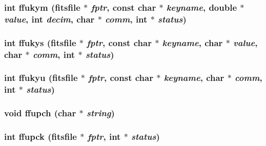 \subsubsection{\setlength{\rightskip}{0pt plus 5cm}int ffukym (\bf{fitsfile} $\ast$ {\em fptr}, const char $\ast$ {\em keyname}, double $\ast$ {\em value}, int {\em decim}, char $\ast$ {\em comm}, int $\ast$ {\em status})}\label{fitsio_8h_7f9c7ad3634517428c532d6cb125197c}


\subsubsection{\setlength{\rightskip}{0pt plus 5cm}int ffukys (\bf{fitsfile} $\ast$ {\em fptr}, const char $\ast$ {\em keyname}, char $\ast$ {\em value}, char $\ast$ {\em comm}, int $\ast$ {\em status})}\label{fitsio_8h_f2361053199299cb14085a216f6ea150}


\subsubsection{\setlength{\rightskip}{0pt plus 5cm}int ffukyu (\bf{fitsfile} $\ast$ {\em fptr}, const char $\ast$ {\em keyname}, char $\ast$ {\em comm}, int $\ast$ {\em status})}\label{fitsio_8h_1693ffec7e5ec0faf0d81491528af4d5}


\subsubsection{\setlength{\rightskip}{0pt plus 5cm}void ffupch (char $\ast$ {\em string})}\label{fitsio_8h_04d7a1a291fdea65a0d6033416d3185b}


\subsubsection{\setlength{\rightskip}{0pt plus 5cm}int ffupck (\bf{fitsfile} $\ast$ {\em fptr}, int $\ast$ {\em status})}\label{fitsio_8h_755efc77a596aa5aafcab3eed4b72c77}


